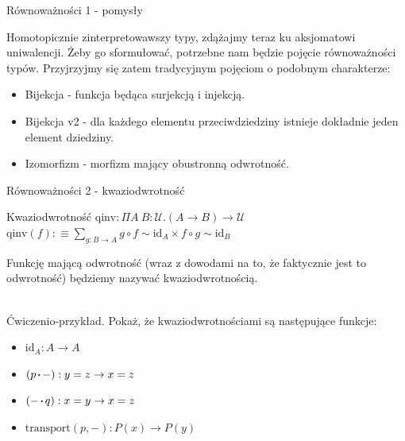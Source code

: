 \documentclass{beamer}
\newcommand{\defn}{:\equiv}
\newcommand{\U}{\mathcal{U}}
\newcommand{\id}{\text{id}}
\newcommand{\comp}{\circ}
\newcommand{\sq}{\mathbin{\vcenter{\hbox{\rule{.3ex}{.3ex}}}}}
\newcommand{\transport}{\text{transport}}
\newcommand{\qinv}{\text{qinv}}
\begin{document}
\begin{frame}{Równoważności 1 - pomysły}

Homotopicznie zinterpretowawszy typy, zdążajmy teraz ku aksjomatowi uniwalencji. Żeby go sformułować, potrzebne nam będzie pojęcie równoważności typów. Przyjrzyjmy się zatem tradycyjnym pojęciom o podobnym charakterze:

\begin{itemize}
	\item Bijekcja - funkcja będąca surjekcją i injekcją.
	\item Bijekcja v2 - dla każdego elementu przeciwdziedziny istnieje dokładnie jeden element dziedziny.
	\item Izomorfizm - morfizm mający obustronną odwrotność.
\end{itemize}
\end{frame}

\begin{frame}{Równoważności 2 - kwaziodwrotność}

\begin{block}{Kwaziodwrotność}
$\qinv : \Pi A\ B : \U. (A \to B) \to \U$ \\
$\displaystyle \qinv(f) \defn \sum_{g : B \to A} g \comp f \sim \id_A \times f \comp g \sim \id_B$
\end{block}

Funkcję mającą odwrotność (wraz z dowodami na to, że faktycznie jest to odwrotność) będziemy nazywać kwaziodwrotnością. \\~\

Ćwiczenio-przykład. Pokaż, że kwaziodwrotnościami są następujące funkcje:
\begin{itemize}
	\item $\id_A : A \to A$
	\item $(p \sq -) : y = z \to x = z$
	\item $(- \sq q) : x = y \to x = z$
	\item $\transport(p, -) : P(x) \to P(y)$
\end{itemize}

\end{frame}
\end{document}
